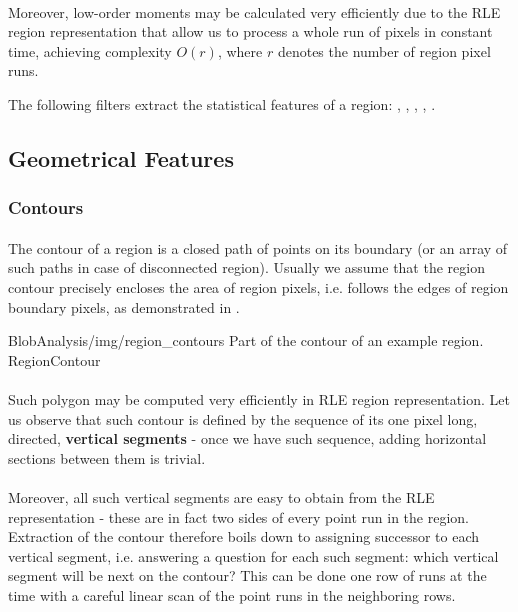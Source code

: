 \paragraph*{}
Moreover, low-order moments may be calculated very efficiently due to the RLE region representation that allow us to process a whole run of pixels in constant time, achieving complexity $O(r)$, where $r$ denotes the number of region pixel runs.

\begin{refImpl}
The following \studio filters extract the statistical features of a region: 
, 
, 
, 
,
. 
\end{refImpl}

\subsection{Geometrical Features}

\subsubsection{Contours}

\paragraph*{}
The contour of a region is a closed path of points on its boundary (or an array of such paths in case of disconnected region). Usually we assume that the region contour precisely encloses the area of region pixels, i.e. follows the edges of region boundary pixels, as demonstrated in .

\oneFigure
{BlobAnalysis/img/region_contours}
{Part of the contour of an example region.}
{RegionContour}
{\basicWidth}

\paragraph*{}
Such polygon may be computed very efficiently in RLE region representation. Let us observe that such contour is defined by the sequence of its one pixel long, directed, \textbf{vertical segments} - once we have such sequence, adding horizontal sections between them is trivial. 

\paragraph*{}
Moreover, all such vertical segments are easy to obtain from the RLE representation - these are in fact two sides of every point run in the region. Extraction of the contour therefore boils down to assigning successor to each vertical segment, i.e. answering a question for each such segment: which vertical segment will be next on the contour? This can be done one row of runs at the time with a careful linear scan of the point runs in the neighboring rows.

